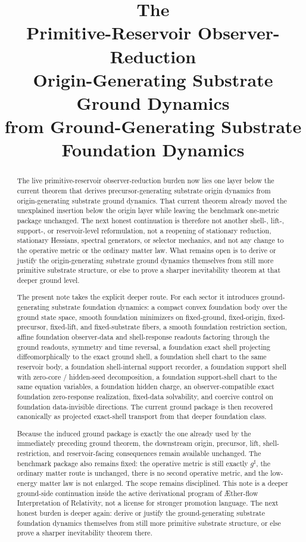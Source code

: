 \documentclass[11pt]{article}
\title{\textbf{The \TheoryName{}}\\[0.4em]
\large Primitive-Reservoir Observer-Reduction\\
\large Origin-Generating Substrate Ground Dynamics\\
\large from Ground-Generating Substrate Foundation Dynamics}
\author{}
\date{}
\newcommand{\Aflow}{\AE{}ther-flow}
\newcommand{\TheoryName}{\Aflow{} Interpretation of Relativity}
\newcommand{\CompletedMetric}{g^{\sharp}}
\begin{document}
\maketitle

\begin{abstract}
The live primitive-reservoir observer-reduction burden now lies one layer below the current theorem that derives precursor-generating substrate origin dynamics from origin-generating substrate ground dynamics. That current theorem already moved the unexplained insertion below the origin layer while leaving the benchmark one-metric package unchanged. The next honest continuation is therefore not another shell-, lift-, support-, or reservoir-level reformulation, not a reopening of stationary reduction, stationary Hessians, spectral generators, or selector mechanics, and not any change to the operative metric or the ordinary matter law. What remains open is to derive or justify the origin-generating substrate ground dynamics themselves from still more primitive substrate structure, or else to prove a sharper inevitability theorem at that deeper ground level.

The present note takes the explicit deeper route. For each sector it introduces ground-generating substrate foundation dynamics: a compact convex foundation body over the ground state space, smooth foundation minimizers on fixed-ground, fixed-origin, fixed-precursor, fixed-lift, and fixed-substrate fibers, a smooth foundation restriction section, affine foundation observer-data and shell-response readouts factoring through the ground readouts, symmetry and time reversal, a foundation exact shell projecting diffeomorphically to the exact ground shell, a foundation shell chart to the same reservoir body, a foundation shell-internal support recorder, a foundation support shell with zero-core / hidden-seed decomposition, a foundation support-shell chart to the same equation variables, a foundation hidden charge, an observer-compatible exact foundation zero-response realization, fixed-data solvability, and coercive control on foundation data-invisible directions. The current ground package is then recovered canonically as projected exact-shell transport from that deeper foundation class.

Because the induced ground package is exactly the one already used by the immediately preceding ground theorem, the downstream origin, precursor, lift, shell-restriction, and reservoir-facing consequences remain available unchanged. The benchmark package also remains fixed: the operative metric is still exactly \(\CompletedMetric\), the ordinary matter route is unchanged, there is no second operative metric, and the low-energy matter law is not enlarged. The scope remains disciplined. This note is a deeper ground-side continuation inside the active derivational program of \TheoryName{}, not a license for stronger promotion language. The next honest burden is deeper again: derive or justify the ground-generating substrate foundation dynamics themselves from still more primitive substrate structure, or else prove a sharper inevitability theorem there.
\end{abstract}
\end{document}
